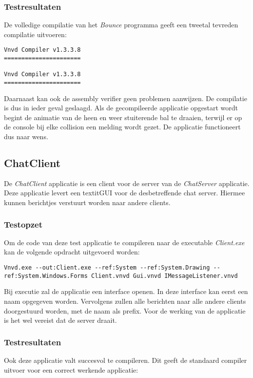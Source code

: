 \subsubsection{Testresultaten}
De volledige compilatie van het \textit{Bounce} programma geeft een tweetal tevreden compilatie uitvoeren:

\begin{lstlisting}
Vnvd Compiler v1.3.3.8
======================

Vnvd Compiler v1.3.3.8
======================

\end{lstlisting}

Daarnaast kan ook de assembly verifier geen problemen aanwijzen. De compilatie is dus in ieder geval geslaagd. Als de gecompileerde applicatie opgestart wordt begint de animatie van de heen en weer stuiterende bal te draaien, terwijl er op de console bij elke collision een melding wordt gezet. De applicatie functioneert dus naar wens.

\subsection{ChatClient}
De \textit{ChatClient} applicatie is een client voor de server van de \textit{ChatServer} applicatie. Deze applicatie levert een textit{GUI} voor de desbetreffende chat server. Hiermee kunnen berichtjes verstuurt worden naar andere clients.

\subsubsection{Testopzet}
Om de code van deze test applicatie te compileren naar de executable \textit{Client.exe} kan de volgende opdracht uitgevoerd worden:

\begin{lstlisting}
Vnvd.exe --out:Client.exe --ref:System --ref:System.Drawing --ref:System.Windows.Forms Client.vnvd Gui.vnvd IMessageListener.vnvd
\end{lstlisting}

Bij executie zal de applicatie een interface openen. In deze interface kan eerst een naam opgegeven worden. Vervolgens zullen alle berichten naar alle andere clients doorgestuurd worden, met de naam als prefix. Voor de werking van de applicatie is het wel vereist dat de server draait.

\subsubsection{Testresultaten}
Ook deze applicatie valt succesvol te compileren. Dit geeft de standaard compiler uitvoer voor een correct werkende applicatie:

